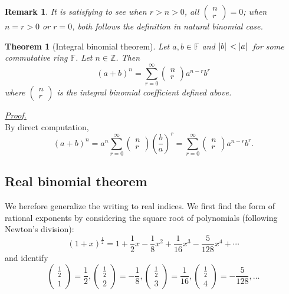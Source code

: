 \documentclass[12pt]{article}
\newtheorem*{theorem}{Theorem}
\newtheorem*{remark}{Remark}
\renewenvironment{proof}[1][Proof]{\begin{snugshade*} \underline{\textit{{#1}.}}\\}{\hfill \qedsymbol \end{snugshade*}}
\begin{document}
    \begin{remark}
        It is satisfying to see when $r>n>0$, all $\begin{pmatrix}
            n\\r
        \end{pmatrix}=0$; when $n=r>0$ or $r=0$, both follows the definition in natural binomial case.
    \end{remark}

    \begin{theorem}[Integral binomial theorem]
        Let $a,b\in\mathbb{F}$ and $\abs*{b}<\abs*{a}$ for some commutative ring $\mathbb{F}$. Let $n\in\mathbb{Z}$. Then \[(a+b)^n=\sum_{r=0}^{\infty}\begin{pmatrix}
            n\\r
        \end{pmatrix}a^{n-r} b^{r}\] where $\begin{pmatrix}
            n\\r
        \end{pmatrix}$ is the integral binomial coefficient defined above.
    \end{theorem}

    \begin{proof}
        By direct computation, \[(a+b)^n=a^n\sum_{r=0}^{\infty}\begin{pmatrix}
            n\\r
        \end{pmatrix}(\frac{b}{a})^r=\sum_{r=0}^{\infty}\begin{pmatrix}
            n\\r
        \end{pmatrix}a^{n-r}b^r.\]
    \end{proof}

    \subsection{Real binomial theorem}

    We herefore generalize the writing to real indices. We first find the form of rational exponents by considering the square root of polynomials (following Newton's division):\[(1+x)^{\frac{1}{2}}=1+\frac{1}{2}x-\frac{1}{8}x^2+\frac{1}{16}x^3-\frac{5}{128}x^4+\cdots\] and identify \[\begin{pmatrix}
        \frac{1}{2}\\1
    \end{pmatrix}=\frac{1}{2}, \begin{pmatrix}
        \frac{1}{2}\\2
    \end{pmatrix}=-\frac{1}{8}, \begin{pmatrix}
        \frac{1}{2}\\3
    \end{pmatrix}=\frac{1}{16}, \begin{pmatrix}
        \frac{1}{2}\\4
    \end{pmatrix}=-\frac{5}{128},\dots\]
\end{document}
